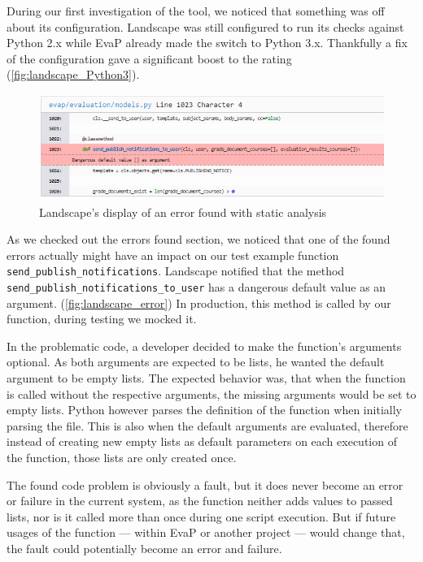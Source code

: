 During our first investigation of the tool, we noticed that something was off about its configuration.
Landscape was still configured to run its checks against Python 2.x while EvaP already made the switch to Python 3.x.
Thankfully a fix of the configuration gave a significant boost to the rating (\autoref{fig:landscape_Python3}).

\begin{figure}[h]
    \centering
    \includegraphics[width=\textwidth, keepaspectratio]{graphics/landscape_error}
    \caption{Landscape's display of an error found with static analysis}
    \label{fig:landscape_error}
\end{figure}

As we checked out the errors found section, we noticed that one of the found errors actually might have an impact on our test example function \texttt{send\_publish\_notifications}.
Landscape notified that the method \texttt{send\_publish\_notifications\_to\_user} has a dangerous default value as an argument.
(\autoref{fig:landscape_error})
In production, this method is called by our function, during testing we mocked it.

In the problematic code, a developer decided to make the function's arguments optional.
As both arguments are expected to be lists, he wanted the default argument to be empty lists.
The expected behavior was, that when the function is called without the respective arguments, the missing arguments would be set to empty lists.
Python however parses the definition of the function when initially parsing the file.
This is also when the default arguments are evaluated, therefore instead of creating new empty lists as default parameters on each execution of the function, those lists are only created once.

The found code problem is obviously a fault, but it does never become an error or failure in the current system, as the function neither adds values to passed lists, nor is it called more than once during one script execution.
But if future usages of the function --- within EvaP or another project --- would change that, the fault could potentially become an error and failure.

